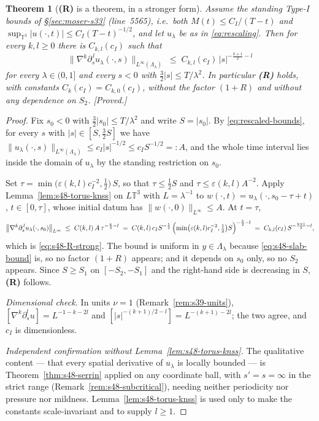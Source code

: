 \documentclass[11pt]{article}
\newtheorem{theorem}{Theorem}[section]
\theoremstyle{definition}
\theoremstyle{remark}
\newcommand{\T}{\mathbb{T}}
\begin{document}
\begin{theorem}[\textbf{(R)} is a theorem, in a stronger form]
  \label{thm:s48-R}
  Assume the standing Type-I bounds of \S\ref{sec:moser-s33} (line~5565),
  i.e.\ both $M(t)\leq C_I/(T-t)$ and $\sup_{\T^3}|u(\cdot,t)|\leq
  C_I(T-t)^{-1/2}$, and let $u_\lambda$ be as in \eqref{eq:rescaling}. Then
  for every $k,l\geq0$ there is $C_{k,l}(c_I)$ such that
  \begin{equation}\label{eq:s48-R-strong}
    \bigl\|\nabla^k\partial_s^{\,l}u_\lambda(\cdot,s)\bigr\|
      _{L^\infty(\Lambda_\lambda)}
    \;\leq\; C_{k,l}(c_I)\,|s|^{-\frac{k+1}{2}-l}
  \end{equation}
  for every $\lambda\in(0,1]$ and every $s<0$ with
  $\tfrac32|s|\leq T/\lambda^2$. In particular \textbf{(R)} holds, with
  constants $C_k(c_I)=C_{k,0}(c_I)$, \emph{without} the factor $(1+R)$ and
  \emph{without} any dependence on $S_2$.
  \emph{[Proved.]}
\end{theorem}
\begin{proof}
  Fix $s_0<0$ with $\tfrac32|s_0|\leq T/\lambda^2$ and write $S=|s_0|$. By
  \eqref{eq:rescaled-bounds}, for every $s$ with $|s|\in[S,\tfrac32S]$ we have
  $\|u_\lambda(\cdot,s)\|_{L^\infty(\Lambda_\lambda)}\leq c_I|s|^{-1/2}\leq
  c_IS^{-1/2}=:A$, and the whole time interval lies inside the domain of
  $u_\lambda$ by the standing restriction on $s_0$.

  Set $\tau=\min\bigl(\varepsilon(k,l)c_I^{-2},\tfrac12\bigr)\,S$, so that
  $\tau\leq\tfrac12 S$ and $\tau\leq\varepsilon(k,l)A^{-2}$. Apply
  Lemma~\ref{lem:s48-torus-knss} on $L\T^3$ with $L=\lambda^{-1}$ to
  $w(\cdot,t)=u_\lambda(\cdot,s_0-\tau+t)$, $t\in[0,\tau]$, whose initial
  datum has $\|w(\cdot,0)\|_{L^\infty}\leq A$. At $t=\tau$,
  \[
    \bigl\|\nabla^k\partial_s^{\,l}u_\lambda(\cdot,s_0)\bigr\|_{L^\infty}
    \;\leq\; C(k,l)\,A\,\tau^{-\frac{k}{2}-l}
    \;=\; C(k,l)\,c_IS^{-\frac12}\,
      \Bigl(\min\bigl(\varepsilon(k,l)c_I^{-2},\tfrac12\bigr)S\Bigr)
        ^{-\frac{k}{2}-l}
    \;=\; C_{k,l}(c_I)\,S^{-\frac{k+1}{2}-l},
  \]
  which is \eqref{eq:s48-R-strong}. The bound is uniform in
  $y\in\Lambda_\lambda$ because \eqref{eq:s48-slab-bound} is, so no factor
  $(1+R)$ appears; and it depends on $s_0$ only, so no $S_2$ appears. Since
  $S\geq S_1$ on $[-S_2,-S_1]$ and the right-hand side is decreasing in $S$,
  \textbf{(R)} follows.

  \emph{Dimensional check.} In units $\nu=1$ (Remark~\ref{rem:s39-units}),
  $[\nabla^k\partial_s^lu]=L^{-1-k-2l}$ and
  $[|s|^{-(k+1)/2-l}]=L^{-(k+1)-2l}$; the two agree, and $c_I$ is
  dimensionless.

  \emph{Independent confirmation without Lemma~\ref{lem:s48-torus-knss}.}
  The qualitative content --- that every spatial derivative of $u_\lambda$ is
  locally bounded --- is Theorem~\ref{thm:s48-serrin} applied on any
  coordinate ball, with $s'=s=\infty$ in the strict range
  (Remark~\ref{rem:s48-subcritical}), needing neither periodicity nor
  pressure nor mildness. Lemma~\ref{lem:s48-torus-knss} is used only to make
  the constants scale-invariant and to supply $l\geq1$.
\end{proof}
\end{document}
